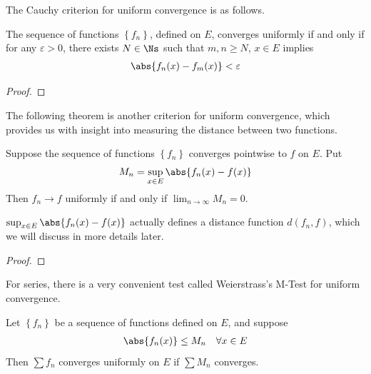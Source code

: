 \documentclass[thmcnt=section, 12pt]{elegantbook}
\begin{document}

\par The Cauchy criterion for uniform convergence is as follows.

\begin{theorem} \label{thm:6}
    The sequence of functions $\left\{f_n\right\}$, defined on $E$, converges uniformly if and only if for any $\varepsilon > 0$, there exists $N \in \Ns$ such that $m, n \geq N$, $x \in E$ implies 
    \begin{align*}
        \abs{f_n(x) - f_m(x)} < \varepsilon
    \end{align*}
\end{theorem}

\begin{proof}
\end{proof}


\par The following theorem is another criterion for uniform convergence, which provides us with insight into measuring the distance between two functions.

\begin{theorem} \label{thm:8}
    Suppose the sequence of functions $\left\{f_n\right\}$ converges pointwise to $f$ on $E$. Put 
    \begin{align*}
        M_n = \sup_{x \in E} \abs{f_n(x) - f(x)}
    \end{align*}
    Then $f_n \to f$ uniformly if and only if $\lim_{n \to \infty} M_n = 0$.
\end{theorem}

\begin{remark}
    $\sup_{x \in E} \abs{f_n(x) - f(x)}$ actually defines a distance function $d(f_n, f)$, which we will discuss in more details later.
\end{remark}

\begin{proof}
\end{proof}


\par For series, there is a very convenient test called Weierstrass's M-Test for uniform convergence.

\begin{theorem} \label{thm:14}
    Let $\left\{f_n\right\}$ be a sequence of functions defined on $E$, and suppose 
    \begin{align*}
        \abs{f_n(x)} \leq M_n \quad \forall x \in E
    \end{align*}
    Then $\sum f_n$ converges uniformly on $E$ if $\sum M_n$ converges.
\end{theorem}
\end{document}

